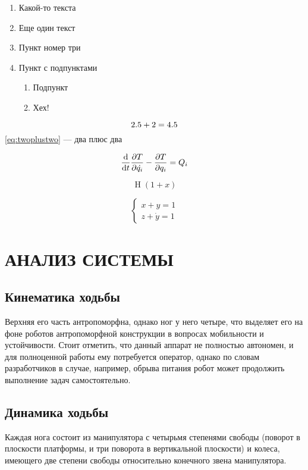 \documentclass[a4paper,14pt,russian]{extreport}
\newcommand*{\hm}[1]{#1\nobreak\discretionary{}
            {\hbox{\mathsurround=0pt #1}}{}}
\DeclareMathOperator{\heviside}{\mathop{H}}
\begin{document}
    \begin{enumerate}
        \item Какой-то текста
        \item Еще один текст
        \item Пункт номер три
        \item Пункт с подпунктами
        \begin{enumerate}
            \item Подпункт 
            \item Хех!
        \end{enumerate}
    \end{enumerate}

    \begin{equation}\label{eq:twoplustwo}
        2.5+2\hm{=}4.5 
    \end{equation}
    \eqref{eq:twoplustwo} --- два плюс два

    $$ \dv{}{t}  \pdv{T}{\dot{q_i}} -\pdv{T}{q_i}=Q_i $$

    $$ \heviside (1+x) $$

    $$ \left\{
    \begin{aligned}
        x+y=1\\z+\dot{y}=1
    \end{aligned} \right.
    $$

    \chapter{\MakeUppercase{Анализ системы}}
    \section{Кинематика ходьбы}

    Верхняя его часть антропоморфна, однако ног у него четыре, что выделяет его на фоне роботов антропоморфной конструкции в вопросах мобильности и устойчивости. Стоит отметить, что данный аппарат не полностью автономен, и для полноценной работы ему потребуется оператор, однако по словам разработчиков в случае, например, обрыва питания робот может продолжить выполнение задач самостоятельно. 

    \section{Динамика ходьбы}

    Каждая нога состоит из манипулятора с четырьмя степенями свободы (поворот в плоскости платформы, и три поворота в вертикальной плоскости) и колеса, имеющего две степени свободы относительно конечного звена манипулятора.
\end{document}
